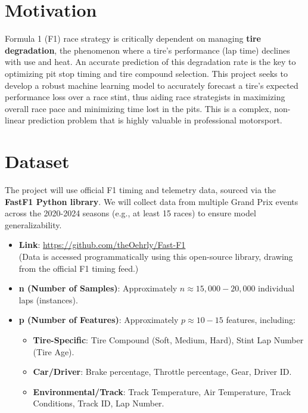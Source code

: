\documentclass[english]{article}
\begin{document}

\section{Motivation}
Formula 1 (F1) race strategy is critically dependent on managing \textbf{tire degradation}, the phenomenon where a tire's performance (lap time) declines with use and heat. An accurate prediction of this degradation rate is the key to optimizing pit stop timing and tire compound selection. This project seeks to develop a robust machine learning model to accurately forecast a tire's expected performance loss over a race stint, thus aiding race strategists in maximizing overall race pace and minimizing time lost in the pits. This is a complex, non-linear prediction problem that is highly valuable in professional motorsport.

\section{Dataset}
The project will use official F1 timing and telemetry data, sourced via the \textbf{FastF1 Python library}. We will collect data from multiple Grand Prix events across the 2020-2024 seasons (e.g., at least 15 races) to ensure model generalizability.

\begin{itemize}
    \item \textbf{Link}: \url{https://github.com/theOehrly/Fast-F1}\\ (Data is accessed programmatically using this open-source library, drawing from the official F1 timing feed.)
    \item \textbf{n (Number of Samples)}: Approximately $n \approx 15,000 - 20,000$ individual laps (instances).
    \item \textbf{p (Number of Features)}: Approximately $p \approx 10-15$ features, including:
    \begin{itemize}
        \item \textbf{Tire-Specific}: Tire Compound (Soft, Medium, Hard), Stint Lap Number (Tire Age).
        \item \textbf{Car/Driver}: Brake percentage, Throttle percentage, Gear, Driver ID.
        \item \textbf{Environmental/Track}: Track Temperature, Air Temperature, Track Conditions, Track ID, Lap Number.
    \end{itemize}
\end{itemize}
\end{document}
